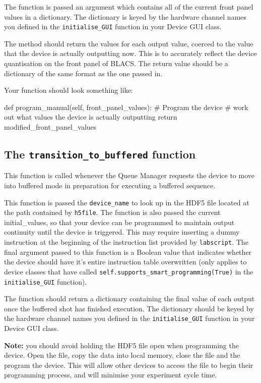 \documentclass[12pt]{article}
\begin{document}
The function is passed an argument which contains all of the current front panel values in a dictionary.
The dictionary is keyed by the hardware channel names you defined in the \texttt{initialise\_GUI} function in your Device GUI class.

The method should return the values for each output value, coerced to the value that the device is actually outputting now.
This is to accurately reflect the device quantisation on the front panel of BLACS.
The return value should be a dictionary of the same format as the one passed in.

Your function should look something like:
\begin{python}
    def program_manual(self, front_panel_values):
        # Program the device
        # work out what values the device is actually outputting
        return modified_front_panel_values
\end{python}



\subsection{The \texttt{transition\_to\_buffered} function}\label{worker:transition_to_buffered}
This function is called whenever the Queue Manager requests the device to move into buffered mode in preparation for executing a buffered sequence.

This function is passed the \texttt{device\_name} to look up in the HDF5 file located at the path contained by \texttt{h5file}.
The function is also passed the current initial\_values, so that your device can be programmed to maintain output continuity until the device is triggered.
This may require inserting a dummy instruction at the beginning of the instruction list provided by \texttt{labscript}.
The final argument passed to this function is a Boolean value that indicates whether the device should have it's entire instruction table overwritten (only applies to device classes that have called \texttt{self.supports\_smart\_programming(True)} in the \texttt{initialise\_GUI} function).

The function should return a dictionary containing the final value of each output once the buffered shot has finished execution.
The dictionary should be keyed by the hardware channel names you defined in the \texttt{initialise\_GUI} function in your Device GUI class.

\textbf{Note:} you should avoid holding the HDF5 file open when programming the device. Open the file, copy the data into local memory, close the file and the program the device.
This will allow other devices to access the file to begin their programming process, and will minimise your experiment cycle time.
\end{document}
